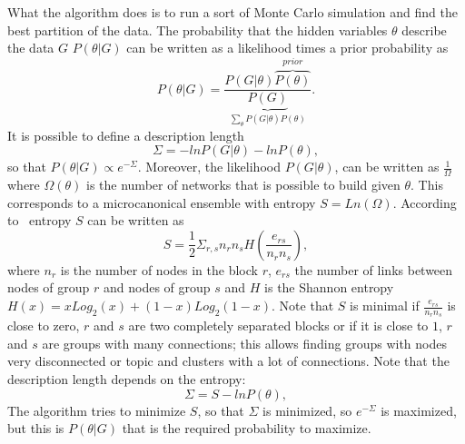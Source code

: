 What the algorithm does is to run a sort of Monte Carlo simulation and find the best partition of the data.
The probability that the hidden variables $\theta$ describe the data $G$ $P(\theta | G)$ can be written as a likelihood times a prior probability as
\[P(\theta|G)=\frac{P(G|\theta)\overbrace{P(\theta)}^{prior}}{\underbrace{P(G)}_{\sum_{\theta}P(G|\theta)P(\theta)}}.\]
It is possible to define a description length
\[
\Sigma=-lnP(G|\theta)-lnP(\theta),
\]
so that $P(\theta | G)\propto e^{-\Sigma}$.
Moreover, the likelihood $P(G | \theta)$, can be written as $\frac{1}{\Omega}$ where $\Omega(\theta)$ is the number of networks that is possible to build given $\theta$. This corresponds to a microcanonical ensemble with entropy $S=Ln\left(\Omega\right)$. According to~\cite{peixoto2017nonparametric} entropy $S$ can be written as
\[
S=\frac{1}{2}\Sigma_{r,s} n_r n_s H\left(\frac{e_{rs}}{n_rn_s}\right),
\]
where $n_r$ is the number of nodes in the block $r$, $e_{rs}$ the number of links between nodes of group $r$ and nodes of group $s$ and $H$ is the Shannon entropy $H(x)=xLog_2(x)+(1-x)Log_2(1-x)$. Note that $S$ is minimal if $\frac{e_{rs}}{n_rn_s}$ is close to zero, $r$ and $s$ are two completely separated blocks or if it is close to $1$, $r$ and $s$ are groups with many connections; this allows finding groups with nodes very disconnected or topic and clusters with a lot of connections. Note that the description length depends on the entropy:
\[
\Sigma=S-lnP(\theta),
\]
The algorithm tries to minimize $S$, so that $\Sigma$ is minimized, so $e^{-\Sigma}$ is maximized, but this is $P(\theta | G)$ that is the required probability to maximize.

